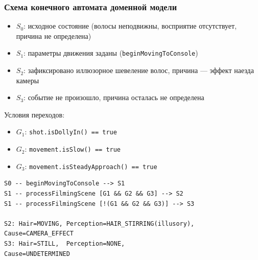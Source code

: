 \documentclass[12pt,a4paper]{report}
\begin{document}
\subsubsection*{Схема конечного автомата доменной модели}
\begin{itemize}
    \item $S_0$: исходное состояние (волосы неподвижны, восприятие отсутствует, причина не определена)
    \item $S_1$: параметры движения заданы (\texttt{beginMovingToConsole})
    \item $S_2$: зафиксировано иллюзорное шевеление волос, причина --- эффект наезда камеры
    \item $S_3$: событие не произошло, причина осталась не определена
\end{itemize}

\noindent Условия переходов:
\begin{itemize}
    \item $G_1$: \texttt{shot.isDollyIn() == true}
    \item $G_2$: \texttt{movement.isSlow() == true}
    \item $G_3$: \texttt{movement.isSteadyApproach() == true}
\end{itemize}

\begin{verbatim}
S0 -- beginMovingToConsole --> S1
S1 -- processFilmingScene [G1 && G2 && G3] --> S2
S1 -- processFilmingScene [!(G1 && G2 && G3)] --> S3

S2: Hair=MOVING, Perception=HAIR_STIRRING(illusory), Cause=CAMERA_EFFECT
S3: Hair=STILL,  Perception=NONE,                    Cause=UNDETERMINED
\end{verbatim}
\end{document}
